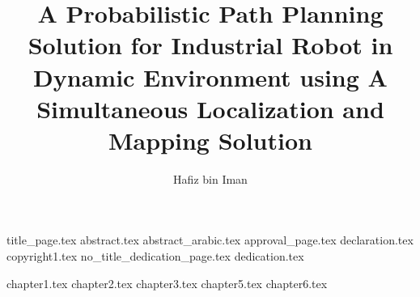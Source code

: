


\author{Hafiz bin Iman}
\title{A Probabilistic Path Planning Solution for Industrial Robot in Dynamic Environment using A Simultaneous Localization and Mapping Solution}

\renewcommand{\setflag}{\newif \ifwhole \wholetrue}


\let\cftchapfontorig\cftchapfont
\let\cftchappagefontorig\cftchappagefont
\let\cftsecfontorig\cftsecfont
\let\cftsecpagefontorig\cftsecpagefont

\renewcommand{\cftchapfont}{\rmfamily}
\renewcommand{\cftchappagefont}{\rmfamily}%

\frontmatter

{title_page.tex}
{abstract.tex}
{abstract_arabic.tex}
{approval_page.tex}
{declaration.tex}
{copyright1.tex}
{no_title_dedication_page.tex}
{dedication.tex}

\renewcommand\contentsname{TABLE OF CONTENTS}
\tableofcontents

\listoftables
\listoffigures

\renewcommand{\glossarypreamble}{\glsfindwidesttoplevelname[\currentglossary]}
\printglossary[type=\acronymtype,title={LIST OF ABBREVIATIONS},toctitle={List of Abbreviations}]
\printglossary[type=symbols,title={LIST OF SYMBOLS AND NOTATIONS},toctitle={List of Symbols and Notations}]
\addtocontents{toc}{\protect\renewcommand{\cftchapfont}{\cftchapfontorig}}
\addtocontents{toc}{\protect\renewcommand{\cftchappagefont}{\cftchappagefontorig}}


\doublespacing
\mainmatter
{chapter1.tex}
{chapter2.tex}
{chapter3.tex}
{chapter5.tex}
{chapter6.tex}

\singlespacing

\setlength\bibitemsep{12pt}

\printbibliography[title=REFERENCES]


